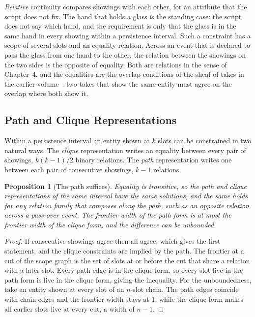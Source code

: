 \documentclass[11pt,twoside,openright]{book}
\theoremstyle{plain}
\newtheorem{proposition}[theorem]{Proposition}
\theoremstyle{definition}
\theoremstyle{remark}
\begin{document}
\emph{Relative} continuity compares showings with each other, for an attribute that the script does not fix. The hand that holds a glass is the standing case: the script does not say which hand, and the requirement is only that the glass is in the same hand in every showing within a persistence interval. Such a constraint has a scope of several slots and an equality relation. Across an event that is declared to pass the glass from one hand to the other, the relation between the showings on the two sides is the opposite of equality. Both are relations in the sense of Chapter~4, and the equalities are the overlap conditions of the sheaf of takes in the earlier volume~\cite{flyxion2026gf}: two takes that show the same entity must agree on the overlap where both show it.

\subsection{Path and Clique Representations}

Within a persistence interval an entity shown at $k$ slots can be constrained in two natural ways. The \emph{clique} representation writes an equality between every pair of showings, $k(k-1)/2$ binary relations. The \emph{path} representation writes one between each pair of consecutive showings, $k-1$ relations.

\begin{proposition}[The path suffices]\label{prop:path}
Equality is transitive, so the path and clique representations of the same interval have the same solutions, and the same holds for any relation family that composes along the path, such as an opposite relation across a pass-over event. The frontier width of the path form is at most the frontier width of the clique form, and the difference can be unbounded.
\end{proposition}

\begin{proof}
If consecutive showings agree then all agree, which gives the first statement, and the clique constraints are implied by the path. The frontier at a cut of the scope graph is the set of slots at or before the cut that share a relation with a later slot. Every path edge is in the clique form, so every slot live in the path form is live in the clique form, giving the inequality. For the unboundedness, take an entity shown at every slot of an $n$-slot chain. The path edges coincide with chain edges and the frontier width stays at $1$, while the clique form makes all earlier slots live at every cut, a width of $n-1$.
\end{proof}
\end{document}
